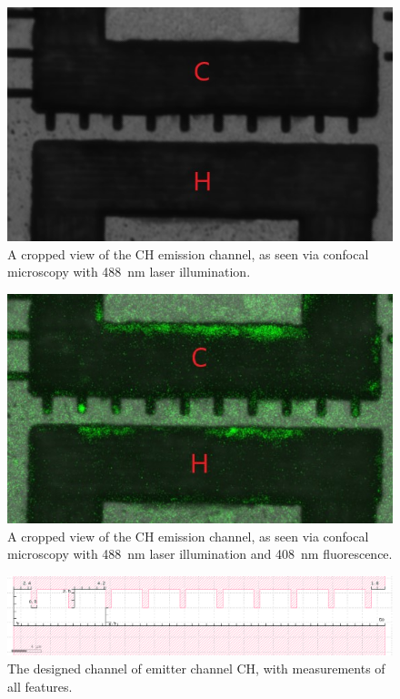 \begin{refsection}
\begin{figure}[H]
    \centering
    \includegraphics[width=\linewidth]{Chapter7/Figs/Raster/ch_channel_esid.jpg}
    \caption{A cropped view of the CH emission channel, as seen via confocal microscopy with 488~\si{\nano\metre} laser illumination.}
    \label{fig:ch_esid}
\end{figure}

\begin{figure}[H]
    \centering
    \includegraphics[width=\linewidth]{Chapter7/Figs/Raster/ch_channel_fl.jpg}
    \caption{A cropped view of the CH emission channel, as seen via confocal microscopy with 488~\si{\nano\metre} laser illumination and 408~\si{\nano\metre} fluorescence.}
    \label{fig:ch_fl}
\end{figure}

\begin{figure}[H]
    \centering
    \includegraphics[width=0.8\linewidth]{Chapter7/Figs/Raster/ch_design2.png}
    \caption{The designed channel of emitter channel CH, with measurements of all features.}
    \label{fig:ch_design}
\end{figure}


\end{refsection}
